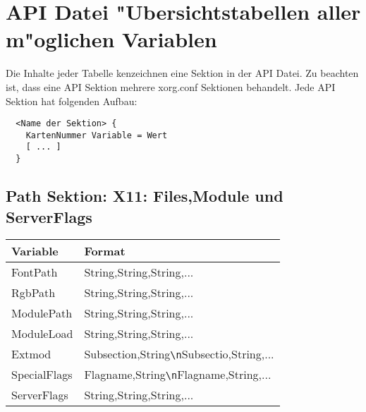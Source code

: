 \section{API Datei "Ubersichtstabellen aller m"oglichen Variablen}
Die Inhalte jeder Tabelle kenzeichnen eine Sektion in der API Datei. 
Zu beachten ist, dass eine API Sektion mehrere xorg.conf Sektionen 
behandelt. Jede API Sektion hat folgenden Aufbau:
\begin{verbatim}
  <Name der Sektion> {
    KartenNummer Variable = Wert
    [ ... ]
  }
\end{verbatim}

\subsection{Path Sektion: X11: Files,Module und ServerFlags}
\begin{tabular}[h]{|p{5cm}|p{7cm}|}
 \hline
 \textbf{Variable}  & \textbf{Format}                \\
 \hline
 FontPath     & String,String,String,...                       \\
 RgbPath      & String,String,String,...                       \\ 
 ModulePath   & String,String,String,...                       \\
 ModuleLoad   & String,String,String,...                       \\
 Extmod       & Subsection,String\verb+\n+Subsectio,String,... \\ 
 SpecialFlags & Flagname,String\verb+\n+Flagname,String,...    \\
 ServerFlags  & String,String,String,...                       \\
 \hline
\end{tabular}

